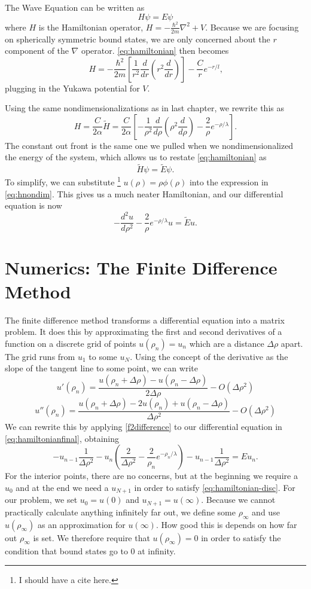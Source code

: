 \documentclass[12pt,twoside]{reedthesis}
\newcommand{\eqn}[1]{\begin{equation}#1\end{equation}}
\begin{document}
The Wave Equation can be written as
\eqn{
H \psi = E\psi
\label{eq:hamiltonian}
}
where $H$ is the Hamiltonian operator, $H =-\frac{\hbar^2}{2m}\nabla^2 +V$.  Because we are focusing on spherically symmetric bound states, we are only concerned about the $r$ component of the $\nabla$ operator. \eqref{eq:hamiltonian} then becomes
\eqn{
H = -\frac{\hbar^2}{2m} \left[\frac{1}{r^2}\frac{d}{dr}\left(r^2 \frac{d}{dr}\right)\right] - \frac{C}{r}e^{-r/l}\mbox{,}
}
plugging in the Yukawa potential for $V$.

Using the same nondimensionalizations as in last chapter, we rewrite this as 
\eqn{
H=\frac{C}{2\alpha}\tilde{H} = \frac{C}{2\alpha} \left[- \frac{1}{\rho^2}\frac{d}{d\rho}\left(\rho^2\frac{d}{d\rho}\right) - \frac{2}{\rho}e^{-\rho/\lambda}\right]\mbox{.}
\label{eq:hnondim}
}
The constant out front is the same one we pulled when we nondimensionalized the energy of the system, which allows us to restate \eqref{eq:hamiltonian} as
\eqn{
\tilde{H}\psi = \tilde{E}\psi\mbox{.}
}
To simplify, we can substitute \footnote{I should have a cite here.} $u(\rho)=\rho \phi(\rho)$ into the expression in \eqref{eq:hnondim}. This gives us a much neater Hamiltonian, and our differential equation is now
\eqn{
-\frac{d^2 u }{d \rho^2} - \frac{2}{\rho}e^{-\rho/\lambda}u = \tilde{E} u\mbox{.}
\label{eq:hamiltonianfinal}
}

\section{Numerics: The Finite Difference Method}
The finite difference method transforms a differential equation into a matrix problem. It does this by approximating the first and second derivatives of a function on a discrete grid of points $u(\rho_n) = u_n$ which are a distance $\Delta \rho$ apart. The grid runs from $u_1$ to some $u_N$. Using the concept of the derivative as the slope of the tangent line to some point, we can write
\eqn{
u'(\rho_n) = \frac{u(\rho_n + \Delta \rho) - u(\rho_n - \Delta \rho)}{2 \Delta \rho} - O(\Delta{\rho}^2)
\label{fdifference}
}
\eqn{
u''(\rho_n) = \frac{u(\rho_n + \Delta \rho) - 2 u(\rho_n) + u(\rho_n - \Delta \rho)}{\Delta \rho^2}-O(\Delta{\rho}^2) 
\label{f2difference}
}
We can rewrite this by applying \eqref{f2difference} to our differential equation in \eqref{eq:hamiltonianfinal}, obtaining
\eqn{
-u_{n-1}\frac{1}{\Delta \rho^2} - u_n\left(\frac{2} {\Delta \rho^2} -  \frac{2}{\rho_n}e^{-\rho_n/\lambda} \right) - u_{n-1}\frac{1}{\Delta \rho^2}  = E u_n\mbox{.}
\label{eq:hamiltonian-disc}
}
For the interior points, there are no concerns, but at the beginning we require a $u_0$ and at the end we need a $u_{N+1}$ in order to satisfy \eqref{eq:hamiltonian-disc}. For our problem, we set $u_0 = u(0)$  and $u_{N+1} = u(\infty)$. Because we cannot practically calculate anything infinitely far out, we define some $\rho_{\infty}$ and use $u(\rho_{\infty})$ as an approximation for $u(\infty)$. How good this is depends on how far out $\rho_{\infty}$ is set. We therefore require that $u(\rho_{\infty}) = 0$ in order to satisfy the condition that bound states go to 0 at infinity. 
\end{document}
